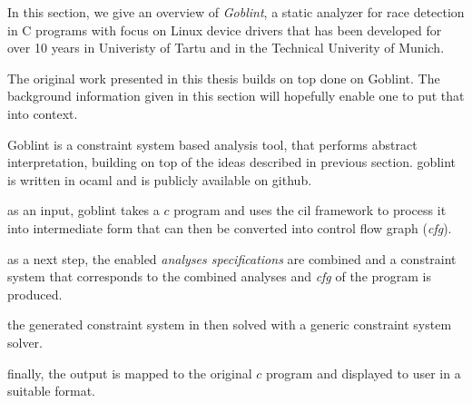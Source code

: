 \documentclass[..thesis.tex]{subfiles}
\begin{document}

In this section, we give an overview  of \textit{Goblint}, a static analyzer for race detection in C programs with focus on Linux device drivers that has been developed for over 10 years in Univeristy of Tartu and in the Technical Univerity of Munich.




The original work presented in this thesis builds on top done on Goblint. The background information given in this section will hopefully enable one to put that into context.


Goblint is a constraint system based analysis tool, that performs abstract interpretation, building on top of the ideas described in previous section. goblint is written in ocaml and is publicly available on github.


as an input, goblint takes a $c$ program and uses the cil framework to process it into intermediate form that can then be converted into control flow graph (\textit{cfg}). 


as a next step, the enabled \textit{analyses specifications} are combined and a constraint system that corresponds to the combined analyses and \textit{cfg} of the program is produced.

the generated constraint system in then solved with a generic constraint system solver. 

finally, the output is mapped to the original $c$ program and displayed to user in a suitable format.
\end{document}
